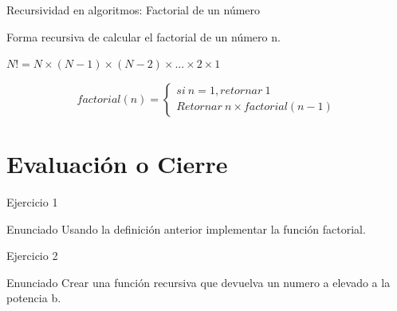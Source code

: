 \documentclass{beamer}
\newcommand{\estiloPython}{
\lstset{
    language=Python,
    basicstyle=\fontsize{15}{20}\ttfamily\ttfamily,
    keywordstyle=\color{jpurple}\bfseries,
    stringstyle=\color{red},
    commentstyle=\color{verde},
    morecomment=[s][\color{blue}]{/**}{*/},
    extendedchars=true,
    showspaces=false,
    showstringspaces=false,
    numbers=left,
    numberstyle=\normalsize,
    breaklines=true,
    backgroundcolor=\color{cyan!10},
    breakautoindent=true,
    captionpos=b,
    xleftmargin=0pt,
    tabsize=2
}}
\begin{document}

\begin{frame}[fragile]{Recursividad en algoritmos: Factorial de un n\'umero}

{\Large Forma recursiva de calcular el factorial de un n\'umero n.}

{\Large $N! = N \times ( N -1) \times ( N -2 ) \times ... \times 2 \times 1$

\begin{equation}
  factorial(n)=\begin{cases}
    si \ n=1, retornar \ 1\\
    Retornar \ n \times factorial(n-1)
  \end{cases}
\end{equation}
}

\end{frame}

\section{Evaluaci\'on o Cierre}

\begin{frame}[fragile]{Ejercicio 1}
  \begin{block}{Enunciado}
Usando la definici\'on anterior implementar la funci\'on factorial.%
    \end{block}

\end{frame} 


\begin{frame}[fragile]{Ejercicio 2}
  \begin{block}{Enunciado}
Crear una funci\'on recursiva que devuelva un numero a elevado a la potencia b.\\
    \end{block}

\end{frame} 
\end{document}
